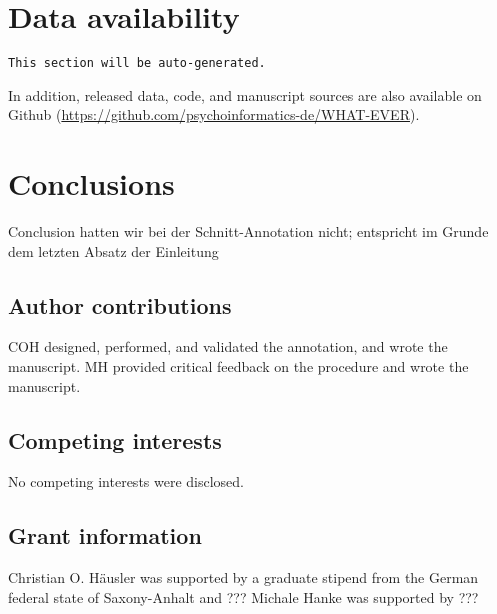 \documentclass[10pt,a4paper,twocolumn]{article}
\begin{document}



\section*{Data availability}
\texttt{This section will be auto-generated.}

In addition, released data, code, and manuscript sources are also available on
Github (\url{https://github.com/psychoinformatics-de/WHAT-EVER}).

\section*{Conclusions}
Conclusion hatten wir bei der Schnitt-Annotation nicht; entspricht im Grunde dem letzten Absatz der Einleitung


\subsection*{Author contributions}
COH designed, performed, and validated the annotation, and wrote the manuscript.
MH provided critical feedback on the procedure and wrote the manuscript.

\subsection*{Competing interests}
No competing interests were disclosed.

\subsection*{Grant information}
Christian O. Häusler was supported by a graduate stipend from the German federal state of Saxony-Anhalt and ???
Michale Hanke was supported by ???
\end{document}
